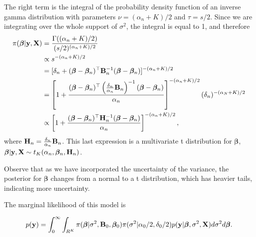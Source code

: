 The right term is the integral of the probability density function of an inverse gamma distribution with parameters $\nu = (\alpha_n+K)/2$ and $\tau = s/2$. Since we are integrating over the whole support of $\sigma^2$, the integral is equal to 1, and therefore
\begin{align*}
	\pi(\bm{\beta}|{\bf{y}},{\bf{X}}) & = \frac{\Gamma((\alpha_n+K)/2)}{(s/2)^{(\alpha_n+K)/2}} \\
	& \propto s^{-(\alpha_n+K)/2} \\
	& = [\delta_n + (\bm{\beta} - \bm{\beta}_n)^{\top}{{\bf{B}}}_n^{-1}(\bm{\beta} - \bm{\beta}_n)]^{-(\alpha_n+K)/2} \\
	& = \left[1 + \frac{(\bm{\beta} - \bm{\beta}_n)^{\top}\left(\frac{\delta_n}{\alpha_n}{{\bf{B}}}_n\right)^{-1}(\bm{\beta} - \bm{\beta}_n)}{\alpha_n}\right]^{-(\alpha_n+K)/2}(\delta_n)^{-(\alpha_N+K)/2} \\
	& \propto \left[1 + \frac{(\bm{\beta} - \bm{\beta}_n)^{\top}{\bf{H}}_n^{-1}(\bm{\beta} - \bm{\beta}_n)}{\alpha_n}\right]^{-(\alpha_n+K)/2},
\end{align*}
where ${\bf{H}}_n = \frac{\delta_n}{\alpha_n}{\bf{B}}_n$. This last expression is a multivariate t distribution for $\bm{\beta}$, $\bm{\beta}|{\bf{y}},{\bf{X}} \sim t_K(\alpha_n, \bm{\beta}_n, {\bf{H}}_n)$.

Observe that as we have incorporated the uncertainty of the variance, the posterior for $\bm{\beta}$ changes from a normal to a t distribution, which has heavier tails, indicating more uncertainty. 

The marginal likelihood of this model is

\begin{align*}
	p({\bf{y}})=\int_0^{\infty}\int_{R^K}\pi (\bm{\beta} | \sigma^2,{\bf{B}}_0,\bm{\beta}_0 )\pi(\sigma^2| \alpha_0/2, \delta_0/2)p({\bf{y}}|\bm{\beta}, \sigma^2, {\bf{X}})d\sigma^2 d\bm{\beta}.
\end{align*}

